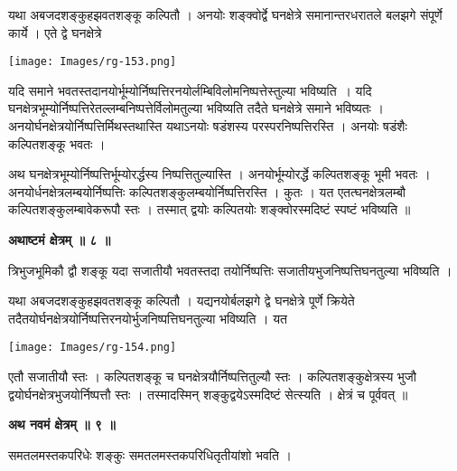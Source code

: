 \documentclass[11pt, openany]{book}
\begin{document}
यथा अबजदशङ्कुहझवतशङ्कू कल्पितौ । अनयोः शङ्क्वोर्द्वे घनक्षेत्रे समानान्तरधरातले बलझगे संपूर्णे कार्ये । एते द्वे घनक्षेत्रे 
\begin{center}
\texttt{[image: Images/rg-153.png]}  
\end{center}

\newpage
\noindent यदि समाने भवतस्तदानयोर्भूम्योर्निष्पत्तिरनयोर्लम्बिविलोमनिष्पत्तेस्तुल्या भविष्यति~। यदि घनक्षेत्रभूम्योर्निष्पत्तिरेतल्लम्बनिष्पत्तेर्विलोमतुल्या भविष्यति तदैते घनक्षेत्रे समाने भविष्यतः । अनयोर्घनक्षेत्रयोर्निष्पत्तिर्मिथस्तथास्ति यथाऽनयोः षडंशस्य परस्परनिष्पत्तिरस्ति । अनयोः षडंशैः कल्पितशङ्कू भवतः । \\
\vspace{3mm}

अथ घनक्षेत्रभूम्योर्निष्पत्तिर्भूम्योरर्द्धस्य निष्पत्तितुल्यास्ति । अनयोर्भूम्योरर्द्धे कल्पितशङ्कू भूमी भवतः ।
अनयोर्धनक्षेत्रलम्बयोर्निष्पत्तिः कल्पितशङ्कुलम्बयोर्निष्पत्तिरस्ति । कुतः । यत एतत्घनक्षेत्रलम्बौ कल्पितशङ्कुलम्बावेकरूपौ स्तः । तस्मात् द्वयोः कल्पितयोः शङ्क्वोरस्मदिष्टं स्पष्टं भविष्यति ॥ \\
\begin{center}
\textbf{\large अथाष्टमं क्षेत्रम् ॥ ८ ॥ }
\end{center}
\vspace{5mm}

{\ab त्रिभुजभूमिकौ द्वौ शङ्कू यदा सजातीयौ भवतस्तदा तयोर्निष्पत्तिः सजातीयभुजनिष्पत्तिघनतुल्या भविष्यति । }\\
\vspace{3mm}

 यथा अबजदशङ्कुहझवतशङ्कू कल्पितौ । यद्यनयोर्बलझगे द्वे घनक्षेत्रे पूर्णे क्रियेते
तदैतयोर्घनक्षेत्रयोर्निष्पत्तिरनयोर्भुजनिष्पत्तिघनतुल्या भविष्यति । यत  
\begin{center}
\texttt{[image: Images/rg-154.png]}  
\end{center}
एतौ सजातीयौ स्तः । कल्पितशङ्कू च घनक्षेत्रयौर्निष्पत्तितुल्यौ स्तः । कल्पितशङ्कुक्षेत्रस्य भुजौ द्वयोर्घनक्षेत्रभुजयोर्निष्पत्तौ स्तः । तस्मादस्मिन् शङ्कुद्वयेऽस्मदिष्टं सेत्स्यति । क्षेत्रं च पूर्ववत् ॥ 

\newpage
\begin{center}
\textbf{\large अथ नवमं क्षेत्रम् ॥ ९ ॥}
\end{center}
\vspace{5mm}

{\ab समतलमस्तकपरिधेः शङ्कुः समतलमस्तकपरिधितृतीयांशो भवति । }\\
\vspace{3mm}
\end{document}
